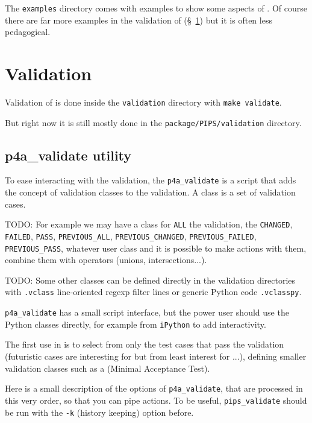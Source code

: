 \documentclass[a4paper]{article}
\begin{document}
The \texttt{examples} directory comes with examples to show some aspects
of \Apfa. Of course there are far more examples in the validation of \Apfa
(\S~\ref{sec:validation}) but it is often less pedagogical.


\section{Validation}
\label{sec:validation}


Validation of \Apfa is done inside the \texttt{validation} directory with
\texttt{make validate}.

But right now it is still mostly done in the
\texttt{package/PIPS/validation} directory.


\subsection{p4a\_validate utility}
\label{sec:p4a_validate-utility}


To ease interacting with the validation, the \verb|p4a_validate| is a
script that adds the concept of validation classes to the \Apips
validation. A class is a set of validation cases.

TODO: For example we may have a class for \texttt{ALL} the validation, the
\texttt{CHANGED}, \texttt{FAILED}, \texttt{PASS}, \verb|PREVIOUS_ALL|,
\verb|PREVIOUS_CHANGED|, \verb|PREVIOUS_FAILED|, \verb|PREVIOUS_PASS|,
whatever user class and it is possible to make actions with them, combine
them with operators (unions, intersections...).

TODO: Some other classes can be defined directly in the validation
directories with \texttt{.vclass} line-oriented regexp filter lines or
generic Python code \texttt{.vclasspy}.

\verb|p4a_validate| has a small script interface, but the power user
should use the Python classes directly, for example from \texttt{iPython}
to add interactivity.

The first use in \Apfa is to select from \Apips only the test cases that
pass the validation (futuristic cases are interesting for \Apips but from
least interest for \Apfa...), defining smaller validation classes such as
a \Amat (Minimal Acceptance Test).

Here is a small description of the options of \verb|p4a_validate|, that
are processed in this very order, so that you can pipe actions. To be
useful, \verb|pips_validate| should be run with the \texttt{-k} (history
keeping) option before.
\end{document}
